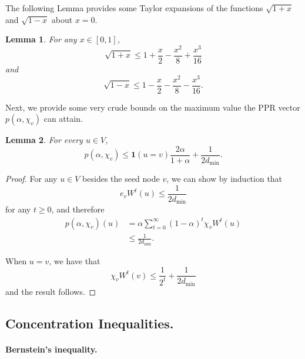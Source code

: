 \documentclass{article}
\newcommand{\1}{\mathbf{1}}
\theoremstyle{alden}
\theoremstyle{aldenthm}
\newtheorem{lemma}{Lemma}
\theoremstyle{remark}
\begin{document}
The following Lemma provides some Taylor expansions of the functions $\sqrt{1 + x}$ and $\sqrt{1 - x}$ about $x = 0$.
\begin{lemma}
	\label{lem:taylor_expansion}
	For any $x \in [0,1]$,
	\begin{equation*}
	\sqrt{1 + x} \leq 1 + \frac{x}{2} - \frac{x^2}{8} + \frac{x^3}{16}
	\end{equation*}
	and
	\begin{equation*}
	\sqrt{1 - x} \leq 1 - \frac{x}{2} - \frac{x^2}{8} - \frac{x^3}{16}.
	\end{equation*}
\end{lemma}

Next, we provide some very crude bounds on the maximum value the PPR vector $p(\alpha,\chi_v)$ can attain.
\begin{lemma}
	\label{lem:crude_ppr_bound}
	For every $u \in V$,
	\begin{equation*}
	p(\alpha,\chi_v) \leq \1(u = v)\frac{2\alpha}{1 + \alpha} + \frac{1}{2d_{\min}}.
	\end{equation*}
\end{lemma}
\begin{proof}
	For any $u \in V$ besides the seed node $v$, we can show by induction that
	\begin{equation*}
	e_v W^t(u) \leq \frac{1}{2 d_{\min}}
	\end{equation*} 
	for any $t \geq 0$, and therefore
	\begin{align*}
	p(\alpha,\chi_v)(u) & = \alpha \sum_{t = 0}^{\infty} (1 - \alpha)^t \chi_v W^t(u) \\
	& \leq  \frac{1}{2d_{\min}}.
	\end{align*}
	
	When $u = v$, we have that 
	\begin{equation*}
	\chi_v W^t(v) \leq \frac{1}{2^t} + \frac{1}{2d_{\min}}
	\end{equation*}
	and the result follows.
\end{proof}

\subsection{Concentration Inequalities.}

\paragraph{Bernstein's inequality.}
\end{document}
